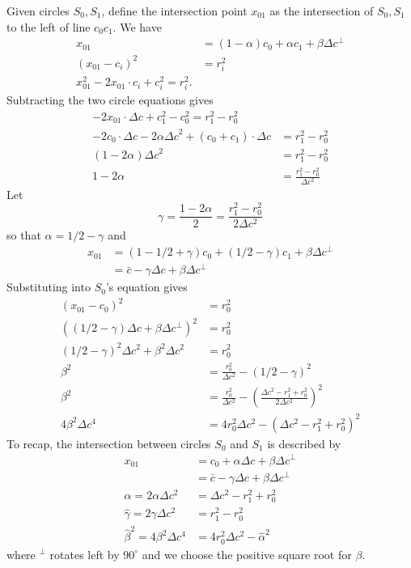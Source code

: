 \documentclass[11pt]{article}
\begin{document}
Given circles $S_0, S_1$, define the intersection point $x_{01}$ as the intersection
of $S_0,S_1$ to the left of line $c_0c_1$.  We have
\begin{align*}
x_{01} &= (1-\alpha) c_0 + \alpha c_1 + \beta \Delta c^\perp \\
(x_{01} - c_i)^2 &= r_i^2 \\
x_{01}^2 - 2x_{01} \cdot c_i + c_i^2 = r_i^2.
\end{align*}
Subtracting the two circle equations gives
\begin{align*}
-2x_{01} \cdot \Delta c + c_1^2 - c_0^2 = r_1^2 - r_0^2 \\
-2c_0 \cdot \Delta c -2\alpha {\Delta c}^2 + (c_0 + c_1) \cdot \Delta c &= r_1^2 - r_0^2 \\
(1-2\alpha) {\Delta c}^2 &= r_1^2 - r_0^2 \\
1 - 2 \alpha &= \frac{r_1^2 - r_0^2}{\Delta c^2}
\end{align*}
Let
$$\gamma = \frac{1 - 2\alpha}{2} = \frac{r_1^2 - r_0^2}{2\Delta c^2}$$
so that $\alpha = 1/2 - \gamma$ and
\begin{align*}
x_{01} &= (1-1/2 + \gamma) c_0 + (1/2 - \gamma) c_1 + \beta \Delta c^\perp \\
       &= \bar{c} - \gamma \Delta c + \beta \Delta c^\perp
\end{align*}
Substituting into $S_0$'s equation gives
\begin{align*}
(x_{01} - c_0)^2 &= r_0^2 \\
\left((1/2 - \gamma) \Delta c + \beta \Delta c^\perp \right)^2 &= r_0^2 \\
(1/2 - \gamma)^2 \Delta c^2 + \beta^2 \Delta c^2 &= r_0^2 \\
\beta^2 &= \frac{r_0^2}{\Delta c^2} - (1/2 - \gamma)^2 \\
\beta^2 &= \frac{r_0^2}{\Delta c^2} - \left(\frac{\Delta c^2 - r_1^2 + r_0^2}{2 \Delta c^2}\right)^2 \\
4 \beta^2 \Delta c^4 &= 4 r_0^2 \Delta c^2 - \left( \Delta c^2 - r_1^2 + r_0^2 \right)^2
\end{align*}
To recap, the intersection between circles $S_0$ and $S_1$ is described by
\begin{align*}
x_{01} &= c_0 + \alpha \Delta c + \beta \Delta c^\perp \\
       &= \bar{c} - \gamma \Delta c + \beta \Delta c^\perp \\
\hat{\alpha} = 2 \alpha \Delta c^2 &= \Delta c^2 - r_1^2 + r_0^2 \\
\hat{\gamma} = 2 \gamma \Delta c^2 &= r_1^2 - r_0^2 \\
\hat{\beta}^2 = 4 \beta^2 \Delta c^4 &= 4 r_0^2 \Delta c^2 - \hat{\alpha}^2
\end{align*}
where $^\perp$ rotates left by $90^\circ$ and we choose the positive square root for $\beta$.
\end{document}
